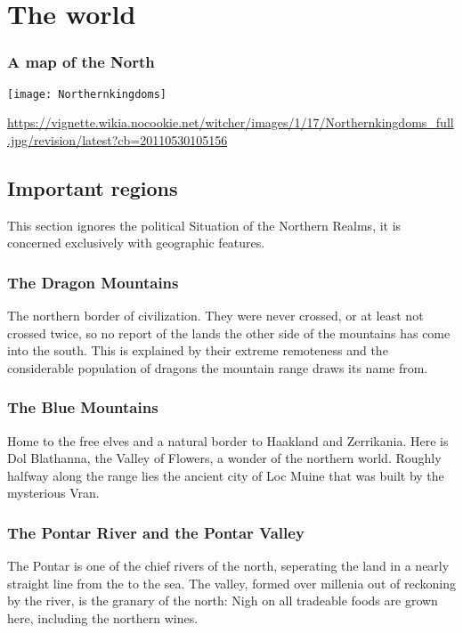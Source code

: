 \documentclass[parskip=full,11pt,%
footheight=38pt]{scrreport}
\begin{document}
\chapter{The world}

\subsection{A map of the North}
\begin{center}
	\texttt{[image: Northernkingdoms]}
	\begin{tiny}\url{https://vignette.wikia.nocookie.net/witcher/images/1/17/Northernkingdoms_full.jpg/revision/latest?cb=20110530105156}\end{tiny}
\end{center}

\section{Important regions}\label{region:dragonMtns}
This section ignores the political Situation of the Northern Realms, it is concerned exclusively with geographic features.
\subsection{The Dragon Mountains}
The northern border of civilization. They were never crossed, or at least not crossed twice, so no report of the lands the other side of the mountains has come into the south.
This is explained by their extreme remoteness and the considerable population of dragons the mountain range draws its name from.

\subsection{The Blue Mountains}\label{region:blueMtns}
Home to the free elves and a natural border to Haakland and Zerrikania. Here is Dol Blathanna, the Valley of Flowers, a wonder of the northern world.
Roughly halfway along the range lies the ancient city of Loc Muine that was built by the mysterious Vran.

\subsection{The Pontar River and the Pontar Valley}\label{region:pontar}
The Pontar is one of the chief rivers of the north, seperating the land in a nearly straight line from the  to the sea.
The valley, formed over millenia out of reckoning by the river, is the granary of the north: Nigh on all tradeable foods are grown here,
including the northern wines.
\end{document}
